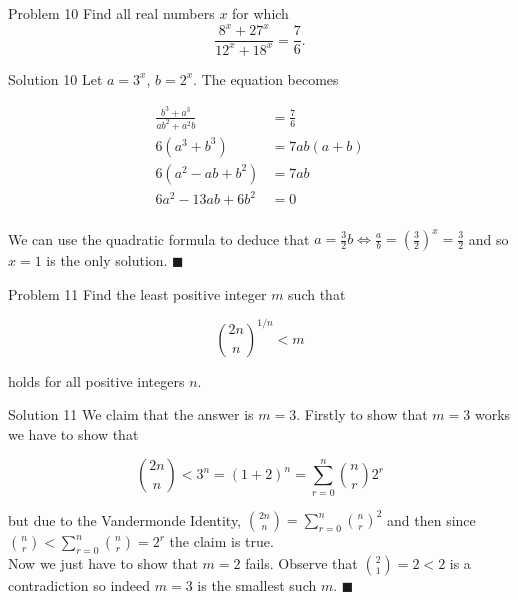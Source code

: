 \documentclass{article}
\begin{document}
\begin{problem}{Problem 10}
Find all real numbers \( x \) for which
\[
\frac{8^x + 27^x}{12^x + 18^x} = \frac{7}{6}.
\]
\end{problem}

\begin{solution}{Solution 10}
Let $a=3^x$, $b=2^x$. The equation becomes

\[
\begin{aligned}
\frac{b^3 + a^3}{ab^2 + a^2 b} &= \frac{7}{6}\\
6(a^3 + b^3) &= 7ab(a+b)\\
6(a^2 - ab + b^2) &= 7ab\\
6a^2 - 13ab + 6b^2 &= 0\\
\end{aligned}
\]

We can use the quadratic formula to deduce that $a = \frac{3}{2} b \iff
\frac{a}{b} = \left( \frac{3}{2} \right)^x = \frac{3}{2}$ and so $x=1$ is
the only solution. $\blacksquare$
\end{solution}

\vspace{0.2cm}

\begin{problem}{Problem 11}
Find the least positive integer $m$ such that

$$
\binom{2n}{n}^{1/n} < m
$$

holds for all positive integers $n$.
\end{problem}

\begin{solution}{Solution 11}
We claim that the answer is $m=3$. Firstly to show that $m=3$ works we
have to show that

$$
\binom{2n}{n} < 3^n = (1+2)^n = \sum_{r=0}^n \binom{n}{r} 2^r
$$

but due to the Vandermonde Identity,
$\binom{2n}{n} = \sum_{r=0}^n \binom{n}{r}^2$ and then since
$\binom{n}{r} < \sum_{r=0}^n \binom{n}{r} = 2^r$ the claim is true. \\

Now we just have to show that $m=2$ fails. Observe that
$\binom{2}{1} = 2 < 2$ is a contradiction so indeed $m=3$ is the smallest
such $m$. $\blacksquare$
\end{solution}
\end{document}
